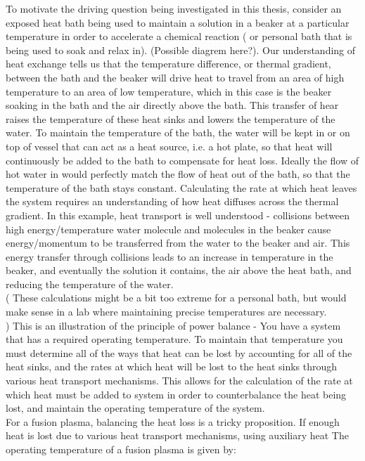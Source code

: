 \documentclass{article}
\begin{document}
To motivate the driving question being investigated in this thesis, consider an exposed heat bath being used to maintain a solution in a beaker at a particular temperature in order to accelerate a chemical reaction ( or personal bath that is being used to soak and relax in). (Possible diagrem here?). Our understanding of heat exchange tells us that the temperature difference, or thermal gradient, between the bath and the beaker will drive heat to travel from an area of high temperature to an area of low temperature, which in this case is the beaker soaking in the bath and the air directly above the bath. This transfer of hear raises the temperature of these heat sinks and lowers the temperature of the water. To maintain the temperature of the bath, the water will be kept in or on top of vessel that can act as a heat source, i.e. a hot plate, so that heat will continuously be added to the bath to compensate for heat loss. Ideally the flow of hot water in would perfectly match the flow of heat out of the bath, so that the temperature of the bath stays constant. Calculating the rate at which heat leaves the system requires an understanding of how  heat diffuses across the thermal gradient. In this example, heat transport is well understood - collisions between high energy/temperature water molecule and molecules in the beaker cause energy/momentum to be transferred from the water to the beaker and air. This energy transfer through collisions leads to an increase in temperature in the beaker, and eventually the solution it contains, the air above the heat bath, and reducing the temperature of the water.\\
( These calculations might be a bit too extreme for a personal bath, but would make sense in a lab where maintaining precise temperatures are necessary.\\)
 This is an illustration of the principle of power balance - You have a system that has a required operating temperature. To maintain that temperature you must determine all of the ways that heat can be lost by accounting for all of the heat sinks, and the rates at which heat will be lost to the heat sinks through various heat transport mechanisms. This allows for the calculation of the rate at which heat must be added to system in order to counterbalance the heat being lost, and maintain the operating temperature of the system.\\
For a fusion plasma, balancing the heat loss is a tricky proposition. If enough heat is lost due to various heat transport mechanisms, using auxiliary heat
The operating temperature of a fusion plasma is given by:
\end{document}
